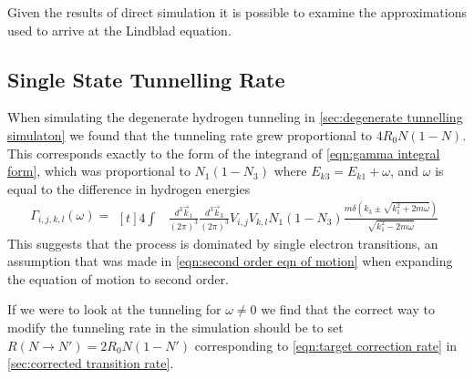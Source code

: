 
Given the results of
direct simulation it is
possible to examine
the approximations
used to arrive at
the Lindblad equation.

\subsection{Single State Tunnelling Rate}\label{sec:Lindblad corrected tunneling}
When simulating the
degenerate hydrogen tunneling in
\cref{sec:degenerate tunnelling simulaton}
we found that the tunneling rate
grew proportional to \(4R_0N(1-N)\).
This corresponds exactly to the
form of the integrand of
\cref{eqn:gamma integral form},
which was proportional to
\(N_1(1 - N_3)\) where
\(E_{k3} = E_{k1} + \omega{}\),
and \(\omega{}\) is equal to
the difference in hydrogen energies
\begin{equation}
    \Gamma_{i,j, k,l}(\omega)  =\begin{aligned}[t]
        4 \int &
        \frac{d^3\vec{k}_1}{{(2\pi)}^3}
        \frac{d^3\vec{k}_3}{{(2\pi)}^3}
        V_{i,j} V_{k,l}
        N_1 (1 - N_3)
        \frac{m\delta({k_3 \pm \sqrt{k_1^2 + 2m\omega}})}{\sqrt{k_1^2 - 2m\omega}}
    \end{aligned}
\end{equation}
This suggests
that the process
is dominated
by single electron
transitions, an assumption
that was made in \cref{eqn:second order eqn of motion}
when expanding the equation
of motion to second order.

If we were to look at the
tunneling for \(\omega \neq 0\)
we find that the correct
way to modify the tunneling
rate in the simulation should
be to set
\(R(N\rightarrow{}N') = 2R_0N(1-N')\)
corresponding to \cref{eqn:target correction rate}
in
\cref{sec:corrected transition rate}.


